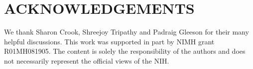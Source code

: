 \documentclass[9pt]{sig-alternate}
\begin{document}


\section{ACKNOWLEDGEMENTS}
We thank Sharon Crook, Shreejoy Tripathy and Padraig Gleeson for their many helpful discussions.  
This work was supported in part by NIMH grant R01MH081905. 
The content is solely the responsibility of the authors and does not necessarily represent the official views of the NIH.
\vspace{5px}


\end{document}
